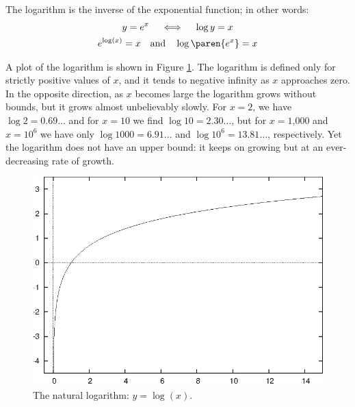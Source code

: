 The logarithm is the inverse of the exponential function; in other
words:
%
\begin{gather*}
  y = e^x \quad \iff \quad \log y = x \\
  e^{\log(x)} = x \quad \text{and} \quad \log\paren{ e^x } = x
\end{gather*}

A plot of the logarithm is shown in Figure \ref{fig:logarithm}. The
logarithm is defined only for strictly positive values of $x$, and it
tends to negative infinity as $x$ approaches zero. In the opposite
direction, as $x$ becomes large the logarithm grows without bounds,
but it grows almost unbelievably slowly. For $x=2$, we have $\log 2 =
0.69\dots$ and for $x=10$ we find $\log 10 = 2.30\dots$, but for
$x=\text{1,000}$ and $x=10^6$ we have only $\log 1000 = 6.91\dots$ and
$\log 10^6 = 13.81\dots$, respectively. Yet the logarithm does not
have an upper bound: it keeps on growing but at an ever-decreasing
rate of growth.

\begin{figure}
  \centerline{\includegraphics{img/logarithm}}
  \caption{The natural logarithm: $y = \log(x)$.}
  \label{fig:logarithm}
\end{figure}

